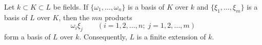 Let $k \subset K \subset L$ be fields. If $\{\omega_1, \ldots, \omega_n\}$ is a basis of $K$ over $k$ and $\{\xi_1, \ldots, \xi_m\}$ is a basis of $L$ over $K$, then the $mn$ products
$$\omega_i \xi_j \qquad (i = 1, 2, \ldots, n;\; j = 1, 2, \ldots, m)$$
form a basis of $L$ over $k$. Consequently, $L$ is a finite extension of $k$.
